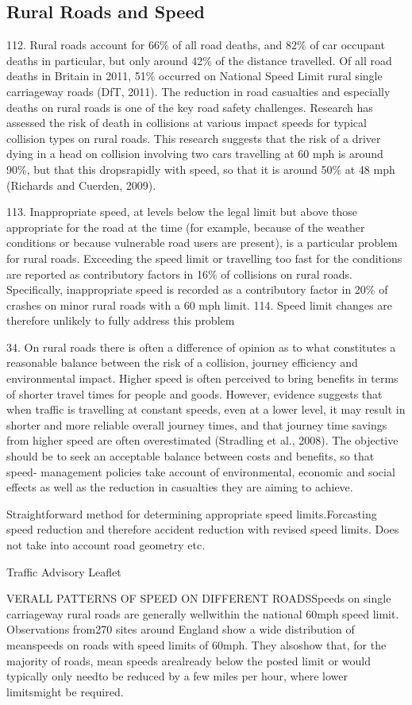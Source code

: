 \begin{multicols}{2}
\section{Rural Roads and Speed}

112. Rural roads account for 66\% of all road deaths, and 82\% of car
occupant deaths in particular, but only around 42\% of the distance
travelled. Of all road deaths in Britain in 2011, 51\% occurred on National
Speed Limit rural single carriageway roads (DfT, 2011). The reduction in
road casualties and especially deaths on rural roads is one of the key road
safety challenges. Research has assessed the risk of death in collisions at
various impact speeds for typical collision types on rural roads. This
research suggests that the risk of a driver dying in a head on collision
involving two cars travelling at 60 mph is around 90\%, but that this dropsrapidly with speed, so that it is around 50\% at 48 mph (Richards and Cuerden, 2009).

113. Inappropriate speed, at levels below the legal limit but above those
appropriate for the road at the time (for example, because of the weather
conditions or because vulnerable road users are present), is a particular
problem for rural roads. Exceeding the speed limit or travelling too fast for
the conditions are reported as contributory factors in 16\% of collisions on
rural roads. Specifically, inappropriate speed is recorded as a contributory
factor in 20\% of crashes on minor rural roads with a 60 mph limit.
114. Speed limit changes are therefore unlikely to fully address this problem


34. On rural roads there is often a difference of opinion as to what constitutes
a reasonable balance between the risk of a collision, journey efficiency
and environmental impact. Higher speed is often perceived to bring
benefits in terms of shorter travel times for people and goods. However,
evidence suggests that when traffic is travelling at constant speeds, even
at a lower level, it may result in shorter and more reliable overall journey
times, and that journey time savings from higher speed are often
overestimated (Stradling et al., 2008). The objective should be to seek an
acceptable balance between costs and benefits, so that speed-
management policies take account of environmental, economic and social
effects as well as the reduction in casualties they are aiming to achieve.

\citep{departmentfortransport2013a} Straightforward method for determining appropriate speed limits.Forcasting speed reduction and therefore accident reduction with revised speed limits. Does not take into account road geometry etc.

Traffic Advisory Leaflet

VERALL PATTERNS OF SPEED ON DIFFERENT ROADSSpeeds on single carriageway rural roads are generally wellwithin the national 60mph speed limit. Observations from270 sites around England show a wide distribution of meanspeeds on roads with speed limits of 60mph. They alsoshow that, for the majority of roads, mean speeds arealready below the posted limit or would typically only needto be reduced by a few miles per hour, where lower limitsmight be required.
\end{multicols}

